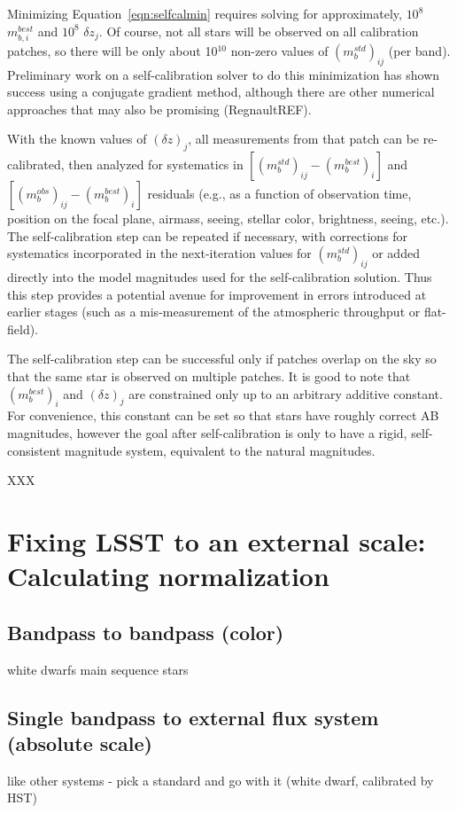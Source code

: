 \documentclass[12pt,preprint]{aastex}
\begin{document}
Minimizing Equation~\ref{eqn:selfcalmin} requires solving for
approximately, $10^8$ $m_{b,i}^{best}$ and $10^8$ $\delta z_j$. Of
course, not all stars will be observed on all calibration patches, so
there will be only about 10$^{10}$ non-zero values of
$(m_b^{std})_{ij}$ (per band). Preliminary work on a self-calibration
solver to do this minimization has shown success using a conjugate
gradient method, although there are other numerical approaches that
may also be promising (RegnaultREF).

With the known values of $(\delta z)_j$, all measurements from that
patch can be re-calibrated, then analyzed for systematics in
$[(m_b^{std})_{ij} - (m_b^{best})_{i}]$ and $[(m_b^{obs})_{ij} -
(m_b^{best})_{i}]$ residuals (e.g., as a function of observation time,
position on the focal plane, airmass, seeing, stellar color,
brightness, seeing, etc.). The self-calibration step can be repeated
if necessary, with corrections for systematics incorporated in the
next-iteration values for $(m_b^{std})_{ij}$ or added directly into
the model magnitudes used for the self-calibration solution. Thus this
step provides a potential avenue for improvement in errors introduced
at earlier stages (such as a mis-measurement of the atmospheric
throughput or flat-field). 

The self-calibration step can be successful only if patches
overlap on the sky so that the same star is observed on 
multiple patches. It is good to note that $(m_b^{best})_{i}$ and 
$(\delta z)_j$ are constrained only up to an arbitrary 
additive constant. For convenience, this constant can be set so that
stars have roughly correct AB magnitudes, however the goal after
self-calibration is only to have a rigid, self-consistent magnitude
system, equivalent to the natural magnitudes.

XXX

\section{Fixing LSST to an external scale: Calculating normalization}
\subsection{Bandpass to bandpass (color)}
white dwarfs
main sequence stars
\subsection{Single bandpass to external flux system (absolute scale)}
like other systems - pick a standard and go with it (white dwarf,
calibrated by HST)
\end{document}
